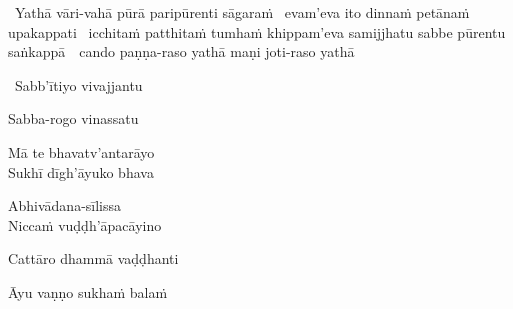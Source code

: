 \anglebracketleft\ \hspace{-0.5mm}Yathā vāri-vahā pūrā paripūrenti sāgaraṁ \breathmark\ evam'eva ito dinnaṁ petānaṁ upakappati \breathmark\ icchitaṁ patthitaṁ tumhaṁ khippam'eva samijjhatu sabbe pūrentu \mbox{saṅkappā}~\breathmark\ cando paṇṇa-raso yathā maṇi joti-raso yathā\makeatletter\hyperlink{endnote119-appendix}\makeatother \thinspace\hspace{-0.5mm}\anglebracketright\

\suttaRef{[Kp 7]}

\begin{pali-hang}
  \anglebracketleft\ \hspace{-0.5mm}Sabb'ītiyo vivajjantu\makeatletter\hyperlink{endnote120-appendix}\makeatother \thinspace\hspace{-0.5mm}\anglebracketright\ \\
\end{pali-hang}
\begin{pali-hang-together}
  Sabba-rogo vinassatu
\end{pali-hang-together}
\begin{pali-hang-together}
  Mā te bhavatv'antarāyo\\
  Sukhī dīgh'āyuko bhava
\end{pali-hang-together}

\suttaRef{[Dhp A]}

\begin{pali-hang}
  Abhivādana-sīlissa\\
  Niccaṁ vuḍḍh'āpacāyino
\end{pali-hang}
\begin{pali-hang-together}
  Cattāro dhammā vaḍḍhanti
\end{pali-hang-together}
\begin{pali-hang-together}
  Āyu vaṇṇo sukhaṁ balaṁ\makeatletter\hyperlink{endnote121-appendix}\makeatother\makeatletter\hyperlink{endnote145-appendix}\makeatother
\end{pali-hang-together}

